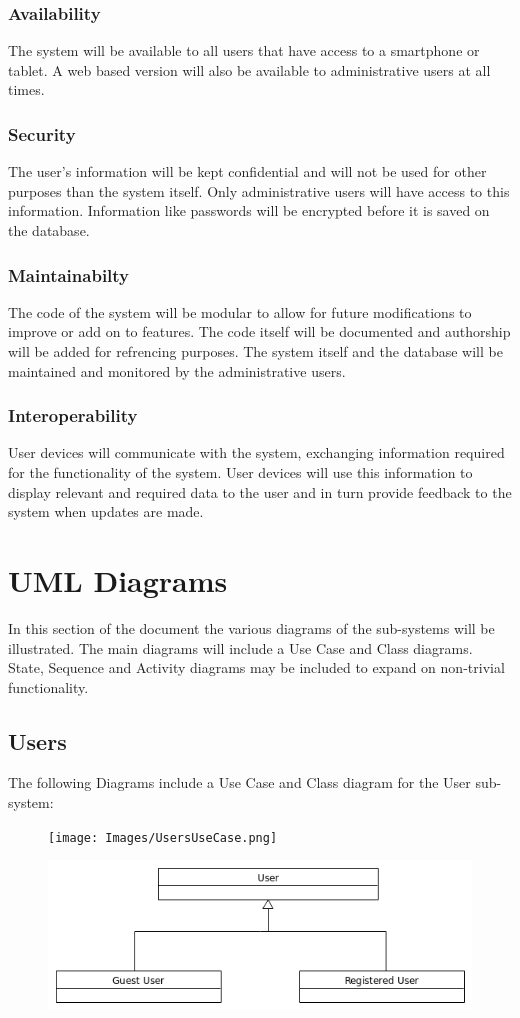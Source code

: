\documentclass{article}
\begin{document}
		\subsubsection{Availability}
		The system will be available to all users that have access to a smartphone or tablet. A web based version will also be available to administrative users at all times.
		\subsubsection{Security}
		The user's information will be kept confidential and will not be used for other purposes than the system itself. Only administrative users will have access to this information. Information like passwords will be encrypted before it is saved on the database.
		\subsubsection{Maintainabilty}
		The code of the system will be modular to allow for future modifications to improve or add on to features. The code itself will be documented and authorship will be added for refrencing purposes. The system itself and the database will be maintained and monitored by the administrative users.
		\subsubsection{Interoperability}
		User devices will communicate with the system, exchanging information required for the functionality of the system. User devices will use this information to display relevant and required data to the user and in turn provide feedback to the system when updates are made.

\section{UML Diagrams}
In this section of the document the various diagrams of the sub-systems will be illustrated. The main diagrams will include a Use Case and Class diagrams. State, Sequence and Activity diagrams may be included to expand on non-trivial functionality.
	\subsection{Users}
	The following Diagrams include a Use Case and Class diagram for the User sub-system:	
	\FloatBarrier	
	\begin{figure}[h]
		\centering
  		\texttt{[image: Images/UsersUseCase.png]}
	\end{figure}
	\begin{figure}[h]
	\centering
  		\includegraphics[width=\textwidth]{Images/UserClass.png}
	\end{figure}
	\FloatBarrier
\end{document}
